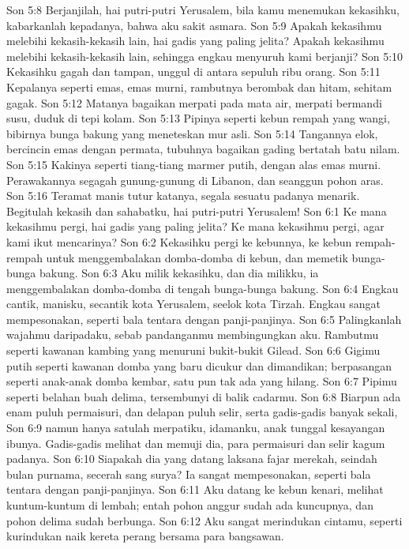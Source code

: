 Son 5:8  Berjanjilah, hai putri-putri Yerusalem, bila kamu menemukan kekasihku, kabarkanlah kepadanya, bahwa aku sakit asmara.
Son 5:9  Apakah kekasihmu melebihi kekasih-kekasih lain, hai gadis yang paling jelita? Apakah kekasihmu melebihi kekasih-kekasih lain, sehingga engkau menyuruh kami berjanji?
Son 5:10  Kekasihku gagah dan tampan, unggul di antara sepuluh ribu orang.
Son 5:11  Kepalanya seperti emas, emas murni, rambutnya berombak dan hitam, sehitam gagak.
Son 5:12  Matanya bagaikan merpati pada mata air, merpati bermandi susu, duduk di tepi kolam.
Son 5:13  Pipinya seperti kebun rempah yang wangi, bibirnya bunga bakung yang meneteskan mur asli.
Son 5:14  Tangannya elok, bercincin emas dengan permata, tubuhnya bagaikan gading bertatah batu nilam.
Son 5:15  Kakinya seperti tiang-tiang marmer putih, dengan alas emas murni. Perawakannya segagah gunung-gunung di Libanon, dan seanggun pohon aras.
Son 5:16  Teramat manis tutur katanya, segala sesuatu padanya menarik. Begitulah kekasih dan sahabatku, hai putri-putri Yerusalem!
Son 6:1  Ke mana kekasihmu pergi, hai gadis yang paling jelita? Ke mana kekasihmu pergi, agar kami ikut mencarinya?
Son 6:2  Kekasihku pergi ke kebunnya, ke kebun rempah-rempah untuk menggembalakan domba-domba di kebun, dan memetik bunga-bunga bakung.
Son 6:3  Aku milik kekasihku, dan dia milikku, ia menggembalakan domba-domba di tengah bunga-bunga bakung.
Son 6:4  Engkau cantik, manisku, secantik kota Yerusalem, seelok kota Tirzah. Engkau sangat mempesonakan, seperti bala tentara dengan panji-panjinya.
Son 6:5  Palingkanlah wajahmu daripadaku, sebab pandanganmu membingungkan aku. Rambutmu seperti kawanan kambing yang menuruni bukit-bukit Gilead.
Son 6:6  Gigimu putih seperti kawanan domba yang baru dicukur dan dimandikan; berpasangan seperti anak-anak domba kembar, satu pun tak ada yang hilang.
Son 6:7  Pipimu seperti belahan buah delima, tersembunyi di balik cadarmu.
Son 6:8  Biarpun ada enam puluh permaisuri, dan delapan puluh selir, serta gadis-gadis banyak sekali,
Son 6:9  namun hanya satulah merpatiku, idamanku, anak tunggal kesayangan ibunya. Gadis-gadis melihat dan memuji dia, para permaisuri dan selir kagum padanya.
Son 6:10  Siapakah dia yang datang laksana fajar merekah, seindah bulan purnama, secerah sang surya? Ia sangat mempesonakan, seperti bala tentara dengan panji-panjinya.
Son 6:11  Aku datang ke kebun kenari, melihat kuntum-kuntum di lembah; entah pohon anggur sudah ada kuncupnya, dan pohon delima sudah berbunga.
Son 6:12  Aku sangat merindukan cintamu, seperti kurindukan naik kereta perang bersama para bangsawan.
